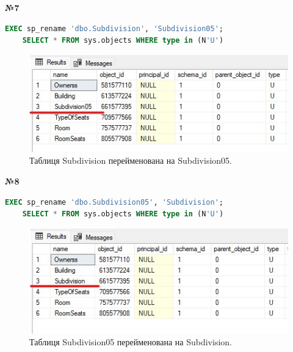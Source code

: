 \documentclass[a4paper,12pt]{article}
\begin{document}
\newpage
	\begin{center}
		\textbf{№7}
	\end{center}
	\begin{lstlisting}[language=SQL]
	EXEC sp_rename 'dbo.Subdivision', 'Subdivision05';
	SELECT * FROM sys.objects WHERE type in (N'U')
	\end{lstlisting}
	\begin{figure}[h!]
		\centering
		\begin{minipage}[h]{0.8\linewidth}
			\includegraphics[width=1\linewidth]{Prt sc/Figure_7.jpg}  
		\end{minipage}
		\caption{Таблиця Subdivision перейменована на Subdivision05.}
	\end{figure}
	\begin{center}
		\textbf{№8}
	\end{center}
	\begin{lstlisting}[language=SQL]
	EXEC sp_rename 'dbo.Subdivision05', 'Subdivision';
	SELECT * FROM sys.objects WHERE type in (N'U')
	\end{lstlisting}
	\begin{figure}[h!]
		\centering
		\begin{minipage}[h]{0.8\linewidth}
			\includegraphics[width=1\linewidth]{Prt sc/Figure_8.jpg}  
		\end{minipage}
		\caption{Таблиця Subdivision05 перейменована на Subdivision.}
	\end{figure}
	
	
	
\end{document}

